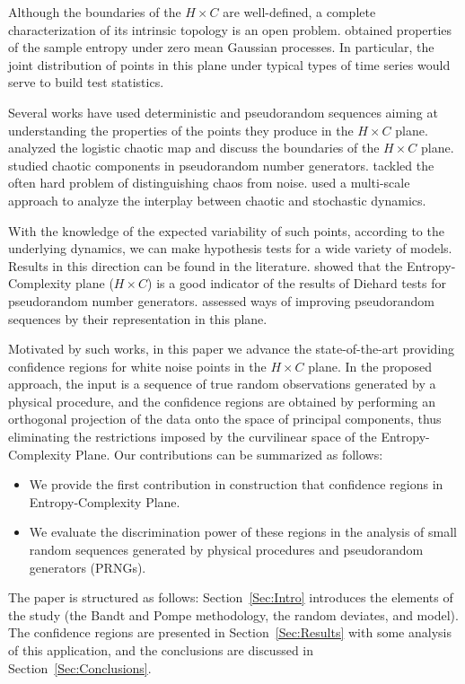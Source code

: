 
Although the boundaries of the $H\times C$ are well-defined, a complete characterization of its intrinsic topology is an open problem.
\citet{OrdinalPatternProbabilities} obtained properties of the sample entropy under zero mean Gaussian processes.
In particular, the joint distribution of points in this plane under typical types of time series would serve to build test statistics.

Several works have used deterministic and pseudorandom sequences aiming at understanding the properties of the points they produce in the $H\times C$ plane.
\cite{GeneralizedStatisticalComplexityMeasuresGeometricalAnalyticalProperties} analyzed the logistic chaotic map and discuss the boundaries of the $H \times C$ plane.
\cite{De_Micco_2009} studied chaotic components in pseudorandom number generators.
\cite{DistinguishingNoiseFromChaos}  tackled the often hard problem of distinguishing chaos from noise.
\cite{DistinguishingChaoticStochasticDynamicsTimeSeriesMultiscaleSymbolicApproach} used a multi-scale approach to analyze the interplay between chaotic and stochastic dynamics.

With the knowledge of the expected variability of such points, according to the underlying dynamics, we can make hypothesis tests for a wide variety of models.
Results in this direction can be found in the literature.
\cite{RandomNumberGeneratorsCausality} showed that the Entropy-Complexity plane ($H\times C$) is a good indicator of the results of Diehard tests for pseudorandom number generators.
\cite{De_Micco_2008} assessed ways of improving pseudorandom sequences by their representation in this plane.

Motivated by such works, in this paper we advance the state-of-the-art providing confidence regions for white noise points in the $H\times C$ plane.
In the proposed approach, the input is a sequence of true random observations generated by a physical procedure, and the confidence regions are obtained by performing an orthogonal projection of the data onto the space of principal components, thus eliminating the restrictions imposed by the curvilinear space of the Entropy-Complexity Plane.
Our contributions can be summarized as follows:
\begin{itemize}
    \item We provide the first contribution in construction that confidence regions in Entropy-Complexity Plane.
    \item We evaluate the discrimination power of these regions in the analysis of small random sequences generated by physical procedures and pseudorandom generators (PRNGs).
\end{itemize}

The paper is structured as follows: Section~\ref{Sec:Intro} introduces the elements of the study (the Bandt and Pompe methodology, the random deviates, and model).
The confidence regions are presented in Section~\ref{Sec:Results} with some analysis of this application, and the conclusions are discussed in Section~\ref{Sec:Conclusions}.
